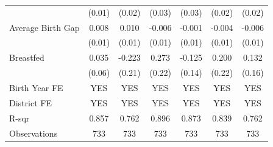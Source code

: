 \begin{longtable}{l*{6}{c}}
                    & (0.01) & (0.02) & (0.03) & (0.03) & (0.02) & (0.02) \\
Average Birth Gap & 0.008 & 0.010\sym{*} & -0.006 & -0.001 & -0.004 & -0.006 \\
                    & (0.01) & (0.01) & (0.01) & (0.01) & (0.01) & (0.01) \\
Breastfed & 0.035 & -0.223 & 0.273 & -0.125 & 0.200 & 0.132 \\
                    & (0.06) & (0.21) & (0.22) & (0.14) & (0.22) & (0.16) \\
\hline
Birth Year FE & YES & YES & YES & YES & YES & YES \\
District FE & YES & YES & YES & YES & YES & YES \\
R-sqr & 0.857 & 0.762 & 0.896 & 0.873 & 0.839 & 0.762 \\
Observations & 733 & 733 & 733 & 733 & 733 & 733 \\
\hline \hline

\end{longtable}